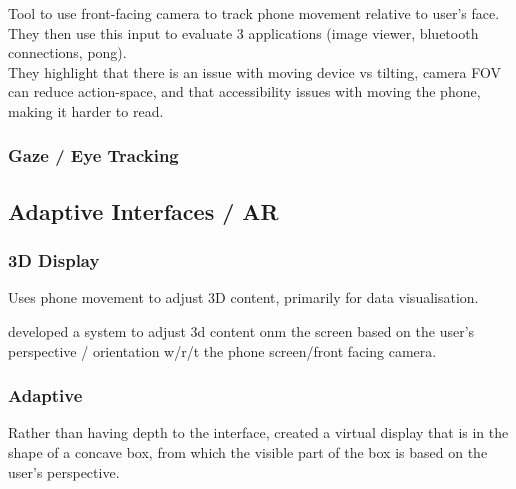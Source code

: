 \cite{hansen2006use} Tool to use front-facing camera to track phone movement relative to user's face.
They then use this input to evaluate 3 applications (image viewer, bluetooth connections, pong).\\
They highlight that there is an issue with moving device vs tilting, camera FOV can reduce action-space, and that accessibility issues with moving the phone, making it harder to read.

\subsubsection{Gaze / Eye Tracking}

\subsection{Adaptive Interfaces / AR}
\subsubsection{3D Display}
\cite{buschel2017investigating} Uses phone movement to adjust 3D content, primarily for data visualisation.

\cite{francone2011using} developed a system to adjust 3d content onm the screen based on the user's perspective / orientation w/r/t the phone screen/front facing camera.

\subsubsection{Adaptive}
Rather than having depth to the interface, \cite{lopez2012head} created a virtual display that is in the shape of a concave box, from which the visible part of the box is based on the user's perspective.\\

